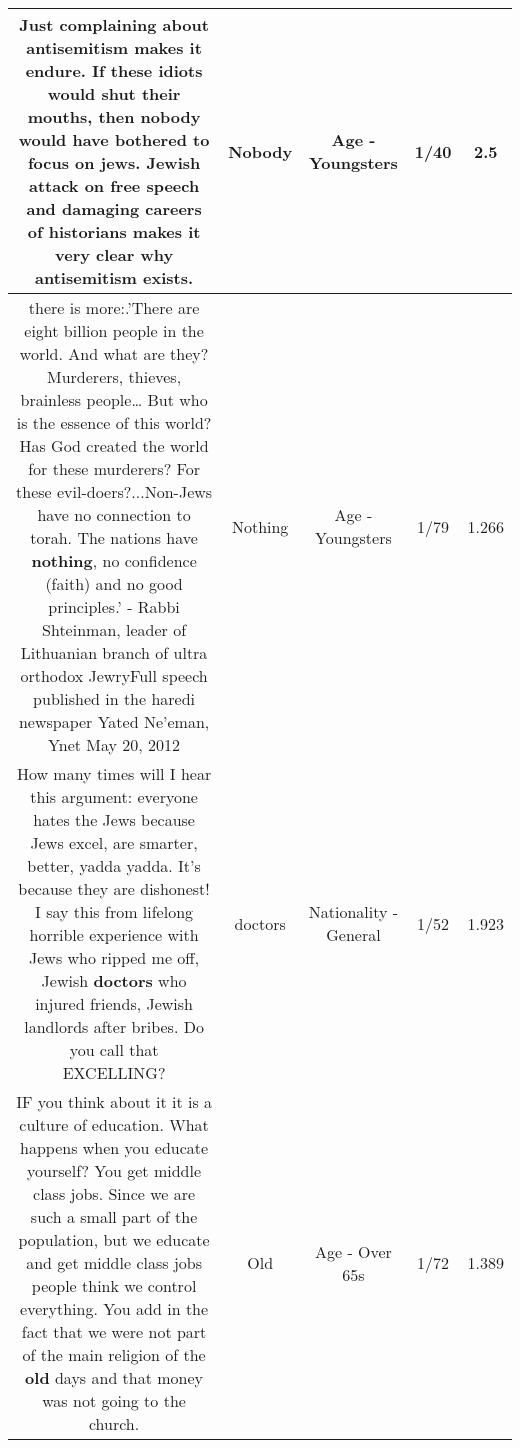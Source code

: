 \documentclass[11pt]{article}
\newlength\mylength
\begin{document}
\begin{center}
\begin{longtable}{|C{.65\mylength}|C{.30\mylength}|C{.12\mylength}|C{.12\mylength}|C{.12\mylength}|}
  \small Just complaining about antisemitism makes it endure. If these idiots would shut their mouths, then \textbf{nobody} would have bothered to focus on jews. Jewish attack on free speech and damaging careers of historians makes it very clear why antisemitism exists.\normalsize   & Nobody & Age - Youngsters & 1/40 & 2.5 \\  \hline
  \small there is more:.'There are eight billion people in the world. And what are they? Murderers, thieves, brainless people… But who is the essence of this world? Has God created the world for these murderers? For these evil-doers?...Non-Jews have no connection to torah. The nations have \textbf{nothing}, no confidence (faith) and no good principles.' - Rabbi Shteinman, leader of Lithuanian branch of ultra orthodox JewryFull speech published in the haredi newspaper Yated Ne'eman, Ynet May 20, 2012\normalsize   & Nothing & Age - Youngsters & 1/79 & 1.266 \\  \hline
  \small How many times will I hear this argument: everyone hates the Jews because Jews excel, are smarter, better, yadda yadda.  It's because they are dishonest!  I say this from lifelong horrible experience with Jews who ripped me off, Jewish \textbf{doctors} who injured friends, Jewish landlords after bribes.  Do you call that EXCELLING?\normalsize   & doctors & Nationality - General & 1/52 & 1.923 \\  \hline
  \small IF you think about it it is a culture of education. What happens when you educate yourself? You get middle class jobs. Since we are such a small part of the population, but we educate and get middle class jobs people think we control everything. You add in the fact that we were not part of the main religion of the \textbf{old} days and that money was not going to the church.\normalsize   & Old & Age - Over 65s & 1/72 & 1.389 \\  \hline
  
\end{longtable}
\end{center}
\end{document}
